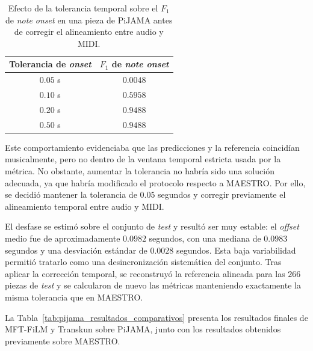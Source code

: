 \documentclass[11pt,spanish,listoffigures,listoftables]{tfgetsinf}
\begin{document}
\begin{table}[H]
  \centering
  \caption[Efecto de la tolerancia temporal en PiJAMA]{%
  Efecto de la tolerancia temporal sobre el $F_1$ de \textit{note onset} en una
  pieza de PiJAMA antes de corregir el alineamiento entre audio y MIDI.}
  \label{tab:pijama_tolerancia_onset}
  
  \begin{tabular}{cc}
    \hline
    \textbf{Tolerancia de \textit{onset}} &
    \textbf{$F_1$ de \textit{note onset}} \\
    \hline
    $0.05$ s & $0.0048$ \\
    $0.10$ s & $0.5958$ \\
    $0.20$ s & $0.9488$ \\
    $0.50$ s & $0.9488$ \\
    \hline
  \end{tabular}
\end{table}

Este comportamiento evidenciaba que las predicciones y la referencia coincidían
musicalmente, pero no dentro de la ventana temporal estricta usada por la métrica. No
obstante, aumentar la tolerancia no habría sido una solución adecuada, ya que habría
modificado el protocolo respecto a MAESTRO. Por ello, se decidió mantener la tolerancia
de $0.05$ segundos y corregir previamente el alineamiento temporal entre audio y MIDI.

El desfase se estimó sobre el conjunto de \textit{test} y resultó ser muy estable: el \textit{offset} medio
fue de aproximadamente $0.0982$ segundos, con una mediana de $0.0983$ segundos y
una desviación estándar de $0.0028$ segundos. Esta baja variabilidad permitió tratarlo
como una desincronización sistemática del conjunto. Tras aplicar la corrección temporal,
se reconstruyó la referencia alineada para las $266$ piezas de \textit{test} y se calcularon de
nuevo las métricas manteniendo exactamente la misma tolerancia que en MAESTRO.

La Tabla~\ref{tab:pijama_resultados_comparativos} presenta los resultados finales de
MFT-FiLM y Transkun sobre PiJAMA, junto con los resultados obtenidos previamente
sobre MAESTRO.
\end{document}
